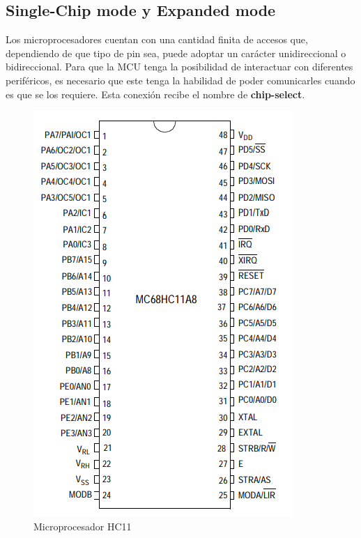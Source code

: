 \subsection{Single-Chip mode y Expanded mode}
Los microprocesadores cuentan con una cantidad finita de accesos que, dependiendo de que tipo de pin sea, puede adoptar un carácter unidireccional o bidireccional. Para que la MCU tenga la posibilidad de interactuar con diferentes periféricos, es necesario que este tenga la habilidad de poder comunicarles cuando es que se los requiere. Esta conexión recibe el nombre de \textbf{chip-select}.

\begin{figure}[H]
	\centering
	\includegraphics[scale=0.5]{ImagenesEjercicio3/MicroHC11}
	\caption{Microprocesador HC11}
	\label{fig:microhc11}
\end{figure}

